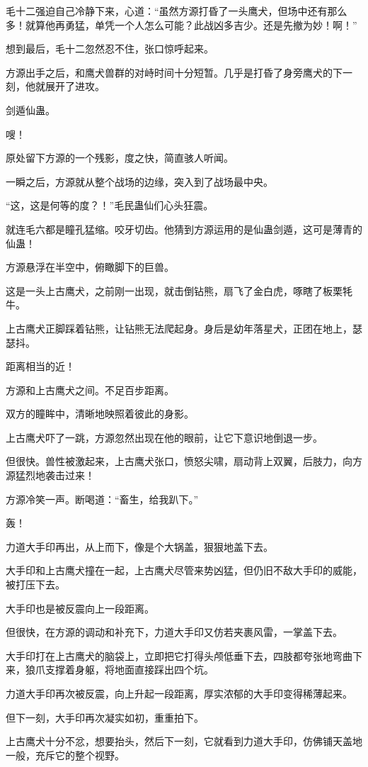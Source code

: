 \begin{this_body}
毛十二强迫自己冷静下来，心道：“虽然方源打昏了一头鹰犬，但场中还有那么多！就算他再勇猛，单凭一个人怎么可能？此战凶多吉少。还是先撤为妙！啊！”

想到最后，毛十二忽然忍不住，张口惊呼起来。

方源出手之后，和鹰犬兽群的对峙时间十分短暂。几乎是打昏了身旁鹰犬的下一刻，他就展开了进攻。

剑遁仙蛊。

嗖！

原处留下方源的一个残影，度之快，简直骇人听闻。

一瞬之后，方源就从整个战场的边缘，突入到了战场最中央。

“这，这是何等的度？！”毛民蛊仙们心头狂震。

就连毛六都是瞳孔猛缩。咬牙切齿。他猜到方源运用的是仙蛊剑遁，这可是薄青的仙蛊！

方源悬浮在半空中，俯瞰脚下的巨兽。

这是一头上古鹰犬，之前刚一出现，就击倒钻熊，扇飞了金白虎，啄瞎了板栗牦牛。

上古鹰犬正脚踩着钻熊，让钻熊无法爬起身。身后是幼年落星犬，正团在地上，瑟瑟抖。

距离相当的近！

方源和上古鹰犬之间。不足百步距离。

双方的瞳眸中，清晰地映照着彼此的身影。

上古鹰犬吓了一跳，方源忽然出现在他的眼前，让它下意识地倒退一步。

但很快。兽性被激起来，上古鹰犬张口，愤怒尖啸，扇动背上双翼，后肢力，向方源猛烈地袭击过来！

方源冷笑一声。断喝道：“畜生，给我趴下。”

轰！

力道大手印再出，从上而下，像是个大锅盖，狠狠地盖下去。

大手印和上古鹰犬撞在一起，上古鹰犬尽管来势凶猛，但仍旧不敌大手印的威能，被打压下去。

大手印也是被反震向上一段距离。

但很快，在方源的调动和补充下，力道大手印又仿若夹裹风雷，一掌盖下去。

大手印打在上古鹰犬的脑袋上，立即把它打得头颅低垂下去，四肢都夸张地弯曲下来，狼爪支撑着身躯，将地面直接踩出四个坑。

力道大手印再次被反震，向上升起一段距离，厚实浓郁的大手印变得稀薄起来。

但下一刻，大手印再次凝实如初，重重拍下。

上古鹰犬十分不忿，想要抬头，然后下一刻，它就看到力道大手印，仿佛铺天盖地一般，充斥它的整个视野。


\end{this_body}
